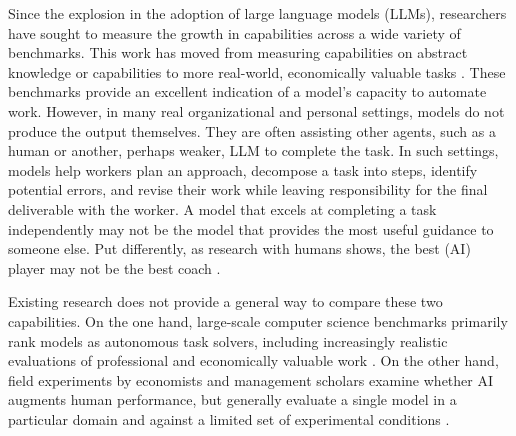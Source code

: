 
Since the explosion in the adoption of large language models (LLMs), researchers have sought to measure the growth in capabilities across a wide variety of benchmarks. This work has moved from measuring capabilities on abstract knowledge or capabilities \citep{hendrycks2021, srivastava2023} to more real-world, economically valuable tasks \citep{gdpval2025, profbench2025, occubench2026}. These benchmarks provide an excellent indication of a model's capacity to automate work. However, in many real organizational and personal settings, models do not produce the output themselves. They are often assisting other agents, such as a human or another, perhaps weaker, LLM to complete the task. In such settings, models help workers plan an approach, decompose a task into steps, identify potential errors, and revise their work while leaving responsibility for the final deliverable with the worker. A model that excels at completing a task independently may not be the model that provides the most useful guidance to someone else. Put differently, as research with humans shows, the best (AI) player may not be the best coach \citep{hinds1999, camerer1989}. 



Existing research does not provide a general way to compare these two capabilities. On the one hand, large-scale computer science benchmarks primarily rank models as autonomous task solvers, including increasingly realistic evaluations of professional and economically valuable work \citep{hendrycks2021, liang2023, gdpval2025, sopbench2025, occubench2026, profbench2025, jobbench2026}. On the other hand, field experiments by economists and management scholars examine whether AI augments human performance, but generally evaluate a single model in a particular domain and against a limited set of experimental conditions \citep{noy2023, peng2023, dellacqua2023, chen2024, doshi2024, brynjolfsson2025, ju2026}. 

